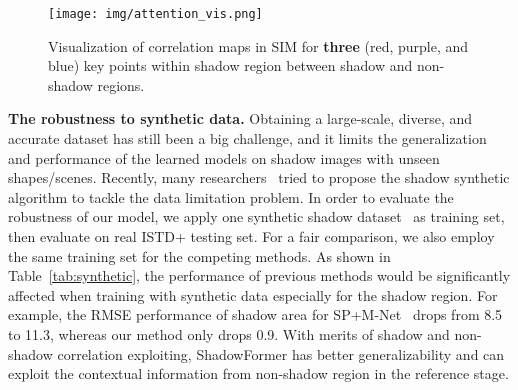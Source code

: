 \documentclass[letterpaper]{article} \usepackage{aaai23}  \usepackage{times}  \usepackage{helvet}  \usepackage{courier}  \usepackage[hyphens]{url}  \usepackage{graphicx} \urlstyle{rm} \def\UrlFont{\rm}  \usepackage{natbib}  \usepackage{caption} \frenchspacing  \setlength{\pdfpagewidth}{8.5in} \setlength{\pdfpageheight}{11in} \usepackage{algorithm}
\begin{document}
\begin{figure}[!t]
\centering
\texttt{[image: img/attention\_vis.png]}
\caption{Visualization of correlation maps in SIM for \textbf{three} (red, purple, and blue) key points within shadow region between shadow and non-shadow regions.} 
\label{fig:vis} 
\end{figure}











\noindent\textbf{The robustness to synthetic data.}
Obtaining a large-scale, diverse, and accurate dataset has still been a big challenge, and it limits the generalization and performance of the learned models on shadow images with unseen shapes/scenes.
Recently, many researchers~\cite{sidorov2019conditional,inoue2020learning} tried to propose the shadow synthetic algorithm to tackle the data limitation problem.
In order to evaluate the robustness of our model, we apply one synthetic shadow dataset~\cite{inoue2020learning} as training set, then evaluate on real ISTD+ testing set.
For a fair comparison, we also employ the same training set for the competing methods.
As shown in Table~\ref{tab:synthetic}, the performance of previous methods would be significantly affected when training with synthetic data especially for the shadow region. For example, the RMSE performance of shadow area for SP+M-Net~\cite{le2019shadow} drops from 8.5 to 11.3, whereas our method only drops 0.9.
With merits of shadow and non-shadow correlation exploiting, ShadowFormer has better generalizability and can exploit the contextual information from non-shadow region in the reference stage.

\begin{table}[!t]
\centering
\footnotesize
\setlength{\tabcolsep}{0.4em}
\renewcommand{\arraystretch}{0.7}
\caption{Quantitative evaluation results (RMSE) on ISTD+ dataset over the SOTA methods and our method training with real data or synthetic data (where S, N, A represent the shadow
area, non-shadow area and all image, respectively).}
\label{tab:synthetic}
\end{table}
\end{document}
